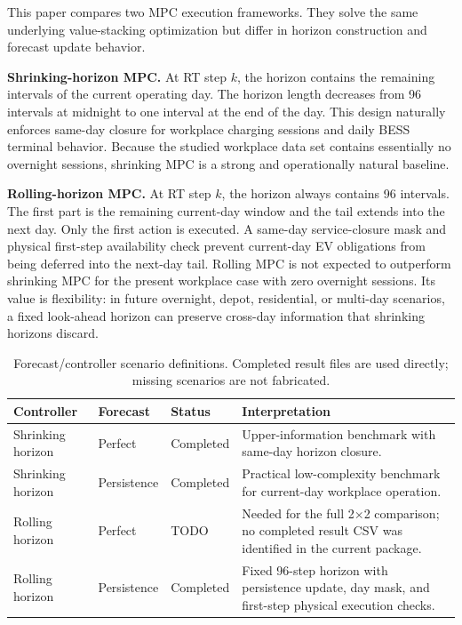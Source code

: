 \documentclass[final,5p,times]{elsarticle}
\begin{document}
This paper compares two MPC execution frameworks. They solve the same underlying value-stacking optimization but differ in horizon construction and forecast update behavior.

\textbf{Shrinking-horizon MPC.} At RT step $k$, the horizon contains the remaining intervals of the current operating day. The horizon length decreases from 96 intervals at midnight to one interval at the end of the day. This design naturally enforces same-day closure for workplace charging sessions and daily BESS terminal behavior. Because the studied workplace data set contains essentially no overnight sessions, shrinking MPC is a strong and operationally natural baseline.

\textbf{Rolling-horizon MPC.} At RT step $k$, the horizon always contains 96 intervals. The first part is the remaining current-day window and the tail extends into the next day. Only the first action is executed. A same-day service-closure mask and physical first-step availability check prevent current-day EV obligations from being deferred into the next-day tail. Rolling MPC is not expected to outperform shrinking MPC for the present workplace case with zero overnight sessions. Its value is flexibility: in future overnight, depot, residential, or multi-day scenarios, a fixed look-ahead horizon can preserve cross-day information that shrinking horizons discard.

\begin{table}[!t]
\centering
\caption{Forecast/controller scenario definitions. Completed result files are used directly; missing scenarios are not fabricated.}
\label{tab:scenario_definitions}
\begin{tabularx}{\textwidth}{@{}p{}p{}p{}p{}@{}}
\toprule
Controller & Forecast & Status & Interpretation \\
\midrule
Shrinking horizon & Perfect & Completed & Upper-information benchmark with same-day horizon closure. \\
Shrinking horizon & Persistence & Completed & Practical low-complexity benchmark for current-day workplace operation. \\
Rolling horizon & Perfect & TODO & Needed for the full 2$\times$2 comparison; no completed result CSV was identified in the current package. \\
Rolling horizon & Persistence & Completed & Fixed 96-step horizon with persistence update, day mask, and first-step physical execution checks. \\
\bottomrule
\end{tabularx}
\end{table}
\end{document}
